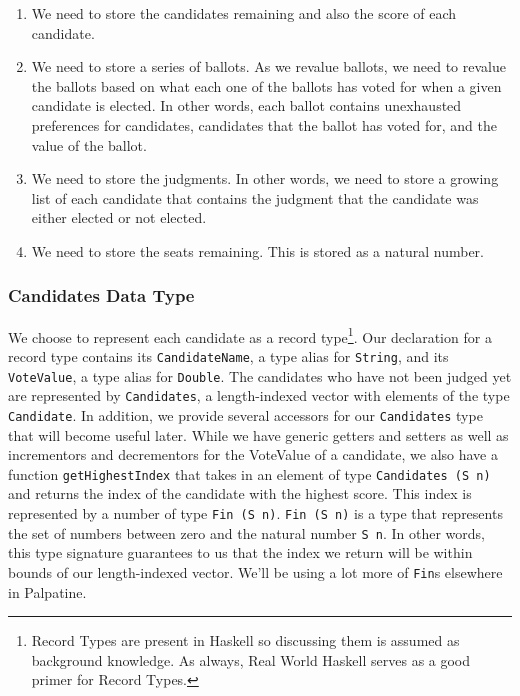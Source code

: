\begin{enumerate}
	\item We need to store the candidates remaining and also the score of each
	      candidate.
	\item We need to store a series of ballots. As we revalue ballots, we need
	      to revalue the ballots based on what each one of the ballots has voted for
	      when a given candidate is elected. In other words, each ballot contains
	      unexhausted preferences for candidates, candidates that the ballot has voted
	      for, and the value of the ballot.
	\item We need to store the judgments. In other words, we need to store a
	      growing list of each candidate that contains the judgment that the candidate
	      was either elected or not elected.
	\item We need to store the seats remaining. This is stored as a natural
	number. 
\end{enumerate}

\subsubsection{Candidates Data Type}

We choose to represent each candidate as a record type\footnote{Record Types are
	present in Haskell so discussing them is assumed as background knowledge. As
	always, Real World Haskell serves as a good primer for Record Types. }. Our
declaration for a record type contains its \texttt{CandidateName}, a type alias
for \texttt{String}, and its \texttt{VoteValue}, a type alias for
\texttt{Double}. The candidates who have not been judged yet are represented by
\texttt{Candidates}, a length-indexed vector with elements of the type
\texttt{Candidate}. In addition, we provide several accessors for our
\texttt{Candidates} type that will become useful later. While we have generic
getters and setters as well as incrementors and decrementors for the VoteValue
of a candidate, we also have a function \texttt{getHighestIndex} that takes in
an element of type \texttt{Candidates (S n)} and returns the index of the
candidate with the highest score. This index is represented by a number of type
\texttt{Fin (S n)}. \texttt{Fin (S n)} is a type that represents the set of
numbers between zero and the natural number \texttt{S n}. In other words, this
type signature guarantees to us that the index we return will be within bounds
of our length-indexed vector. We'll be using a lot more of \texttt{Fin}s
elsewhere in Palpatine.

